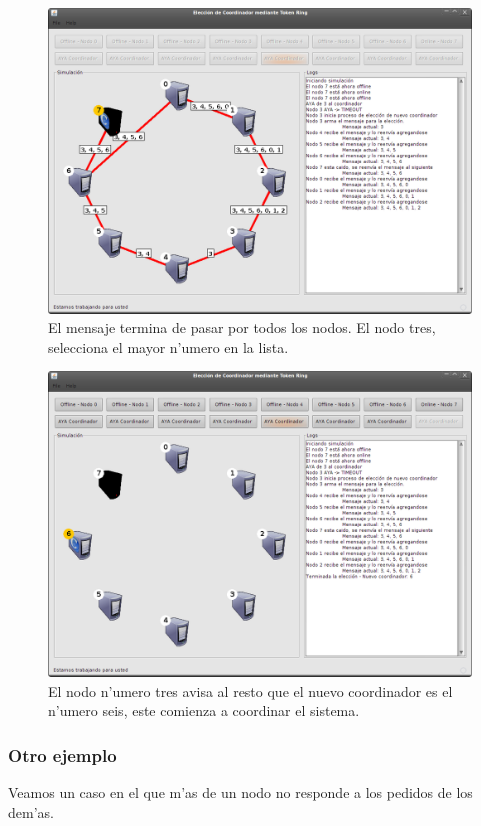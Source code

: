 \begin{figure}[h!]
\centering
 \includegraphics[scale=0.33,keepaspectratio=true]{./imagenes/tokenRing/token5.png}
 \caption{El mensaje termina de pasar por todos los nodos. El nodo tres, selecciona el mayor n'umero en la lista.}
\end{figure}
\newpage

\begin{figure}[h!]
\centering
 \includegraphics[scale=0.33,keepaspectratio=true]{./imagenes/tokenRing/token6.png}
 \caption{El nodo n'umero tres avisa al resto que el nuevo coordinador es el n'umero seis, este comienza a coordinar el sistema.}
\end{figure}

\subsubsection*{Otro ejemplo}
Veamos un caso en el que m'as de un nodo no responde a los pedidos de los dem'as.

